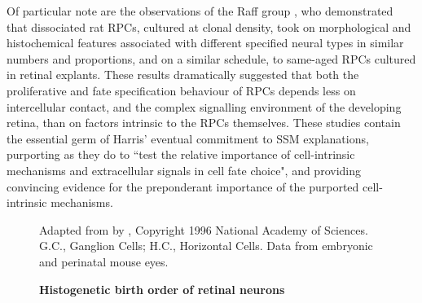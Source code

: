 \label{Raff}
Of particular note are the observations of the Raff group \cite{Watanabe1990,Cayouette2003}, who demonstrated that dissociated rat RPCs, cultured at clonal density, took on morphological and histochemical features associated with different specified neural types in similar numbers and proportions, and on a similar schedule, to same-aged RPCs cultured in retinal explants. These results dramatically suggested that both the proliferative and fate specification behaviour of RPCs depends less on intercellular contact, and the complex signalling environment of the developing retina, than on factors intrinsic to the RPCs themselves. These studies contain the essential germ of Harris' eventual commitment to SSM explanations, purporting as they do to ``test the relative importance of cell-intrinsic mechanisms and extracellular signals in cell fate choice", and providing convincing evidence for the preponderant importance of the purported cell-intrinsic mechanisms.

\begin{figure}[!h]
  \caption{{\bf Histogenetic birth order of retinal neurons}}
  Adapted from \cite{Young1985} by \cite{Cepko1996}, Copyright 1996 National Academy of Sciences. G.C., Ganglion Cells; H.C., Horizontal Cells. Data from embryonic and perinatal mouse eyes.
  \label{horder}
\end{figure}


